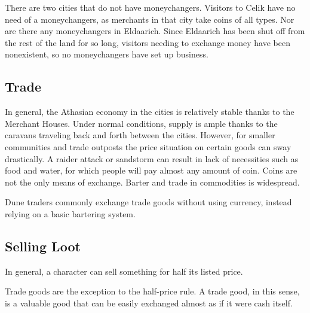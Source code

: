 There are two cities that do not have moneychangers. Visitors to Celik have no need of a moneychangers, as merchants in that city take coins of all types. Nor are there any moneychangers in Eldaarich. Since Eldaarich has been shut off from the rest of the land for so long, visitors needing to exchange money have been nonexistent, so no moneychangers have set up business.

\subsection{Trade}
In general, the Athasian economy in the cities is relatively stable thanks to the Merchant Houses. Under normal conditions, supply is ample thanks to the caravans traveling back and forth between the cities. However, for smaller communities and trade outposts the price situation on certain goods can sway drastically. A raider attack or sandstorm can result in lack of necessities such as food and water, for which people will pay almost any amount of coin. Coins are not the only means of exchange. Barter and trade in commodities is widespread.

Dune traders commonly exchange trade goods without using currency, instead relying on a basic bartering system.



\subsection{Selling Loot}
In general, a character can sell something for half its listed price.

Trade goods are the exception to the half-price rule. A trade good, in this sense, is a valuable good that can be easily exchanged almost as if it were cash itself.



